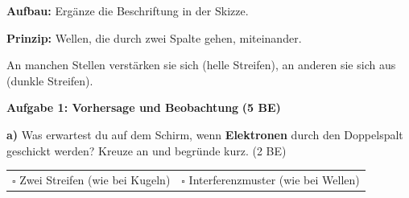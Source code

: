 \documentclass[11pt,a4paper]{article}
\begin{document}
\begin{tcolorbox}[merkbox={Kasten 1: Doppelspalt-Experiment}]
\textbf{Aufbau:} Ergänze die Beschriftung in der Skizze.

\vspace{0.5em}
\begin{center}
\end{center}

\vspace{0.3em}
\textbf{Prinzip:} Wellen, die durch zwei Spalte gehen, \underline{\hspace{3cm}} miteinander.

An manchen Stellen verstärken sie sich (helle Streifen), an anderen \underline{\hspace{3cm}} sie sich aus (dunkle Streifen).
\end{tcolorbox}

\vspace{0.5em}


\textbf{Aufgabe 1: Vorhersage und Beobachtung} \hfill \textbf{(5 BE)}

\textbf{a)} Was erwartest du auf dem Schirm, wenn \textbf{Elektronen} durch den Doppelspalt geschickt werden? Kreuze an und begründe kurz. \hfill (2 BE)

\vspace{0.3em}
\begin{tabular}{@{}p{}p{}@{}}
$\square$ Zwei Streifen (wie bei Kugeln) & $\square$ Interferenzmuster (wie bei Wellen) \\
\end{tabular}
\end{document}

